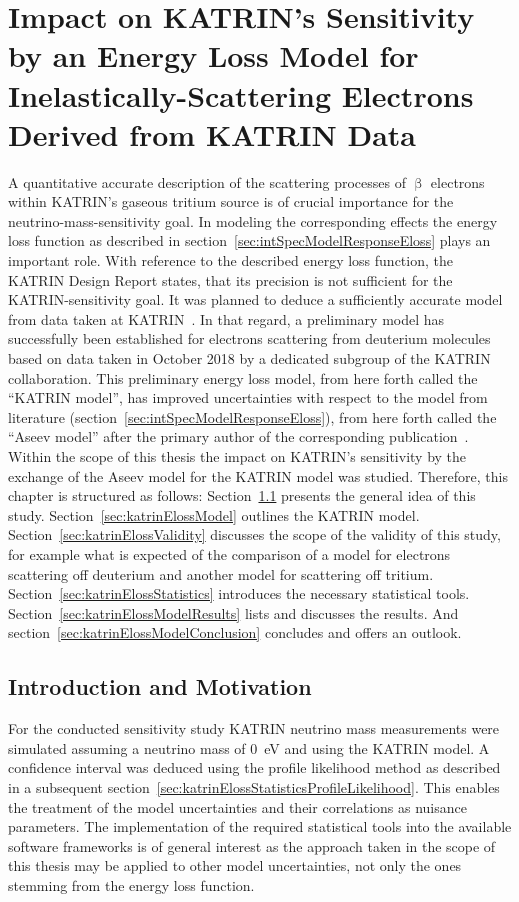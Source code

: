\def\currentRootFolder{chapter/sensitivityStudyWithPreliminaryKatrinElossModel}
\def\currentFigureFolder{\currentRootFolder/fig}

\chapter{Impact on KATRIN's Sensitivity by an Energy Loss Model for Inelastically-Scattering Electrons Derived from KATRIN Data}
\label{sec:katrinEloss}
A quantitative accurate description of the scattering processes of $\upbeta$ electrons within KATRIN's gaseous tritium source is of crucial importance for the neutrino-mass-sensitivity goal. In modeling the corresponding effects the energy loss function as described in section~\ref{sec:intSpecModelResponseEloss} plays an important role. With reference to the described energy loss function, the KATRIN Design Report states, that its precision is not sufficient for the KATRIN-sensitivity goal. It was planned to deduce a sufficiently accurate model from data taken at KATRIN~\cite{Angrik:2005ep}. In that regard, a preliminary model has successfully been established for electrons scattering from deuterium molecules based on data taken in October 2018 by a dedicated subgroup of the KATRIN collaboration. This preliminary energy loss model, from here forth called the ``KATRIN model'', has improved uncertainties with respect to the model from literature (section~\ref{sec:intSpecModelResponseEloss}), from here forth called the ``Aseev model'' after the primary author of the corresponding publication~\cite{Aseev2000}. Within the scope of this thesis the impact on KATRIN's sensitivity by the exchange of the Aseev model for the KATRIN model was studied. Therefore, this chapter is structured as follows: Section~\ref{sec:katrinElossConcept} presents the general idea of this study. Section~\ref{sec:katrinElossModel} outlines the KATRIN model. Section~\ref{sec:katrinElossValidity} discusses the scope of the validity of this study, for example what is expected of the comparison of a model for electrons scattering off deuterium and another model for scattering off tritium. Section~\ref{sec:katrinElossStatistics} introduces the necessary statistical tools. Section~\ref{sec:katrinElossModelResults} lists and discusses the results. And section~\ref{sec:katrinElossModelConclusion} concludes and offers an outlook.

\section{Introduction and Motivation}
\label{sec:katrinElossConcept}
For the conducted sensitivity study KATRIN neutrino mass measurements were simulated assuming a neutrino mass of \SI{0}{eV} and using the KATRIN model. A confidence interval was deduced using the profile likelihood method as described in a subsequent section~\ref{sec:katrinElossStatisticsProfileLikelihood}. This enables the treatment of the model uncertainties and their correlations as nuisance parameters. The implementation of the required statistical tools into the available software frameworks is of general interest as the approach taken in the scope of this thesis may be applied to other model uncertainties, not only the ones stemming from the energy loss function.

